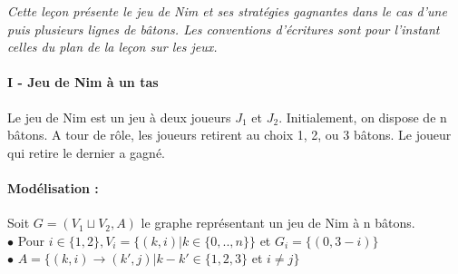 
\textit{Cette leçon présente le jeu de Nim et ses stratégies gagnantes dans le cas d'une puis plusieurs lignes de bâtons. Les conventions d'écritures sont pour l'instant celles du plan de la leçon sur les jeux.}

\paragraph{I - Jeu de Nim à un tas}

\begin{definition}
	Le jeu de Nim est un jeu à deux joueurs $J_{1}$ et  $J_{2}$. Initialement, on dispose de n bâtons. A tour de rôle, les joueurs retirent au choix 1, 2, ou 3 bâtons. Le joueur qui retire le dernier a gagné. 
\end{definition}

\paragraph{Modélisation : \\}
Soit $G=(V_{1} \sqcup V_{2}, A)$ le graphe représentant un jeu de Nim à n bâtons. \\

$\bullet$ Pour $i \in \{1,2\}, V_{i} = \{(k, i) | k \in \{0,.., n\}\}$ et $G_{i} = \{(0, 3-i)\}$ \\

$\bullet$  $A = \{(k, i) \rightarrow (k', j) | k-k' \in \{1,2,3\}$ et $i \neq j \}$

